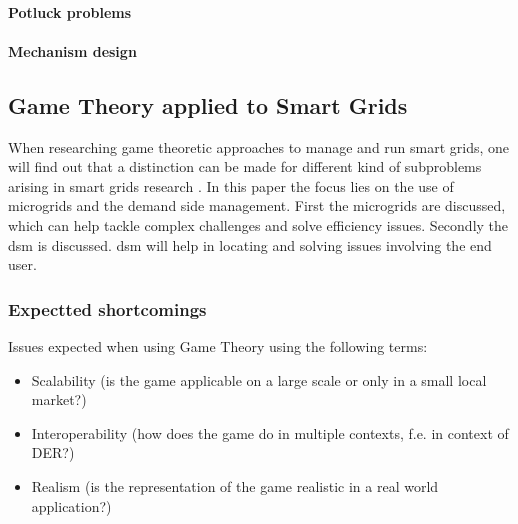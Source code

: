 \paragraph{Potluck problems}

\paragraph{Mechanism design}


\subsection{Game Theory applied to Smart Grids}
When researching game theoretic approaches to manage and run smart grids, one will find out that a distinction can be made for different kind of subproblems arising in smart grids research \cite{keypaper}. In this paper the focus lies on the use of microgrids and the demand side management. First the microgrids are discussed, which can help tackle complex challenges and solve efficiency issues. Secondly the \gls{dsm} is discussed. \gls{dsm} will help in locating and solving issues involving the end user. 


\subsubsection{Expectted shortcomings}

Issues expected when using Game Theory using the following terms:
\begin{itemize}
	\item Scalability (is the game applicable on a large scale or only in a small local market?)
	\item Interoperability (how does the game do in multiple contexts, f.e. in context of DER?)
	\item Realism (is the representation of the game realistic in a real world application?)
\end{itemize}